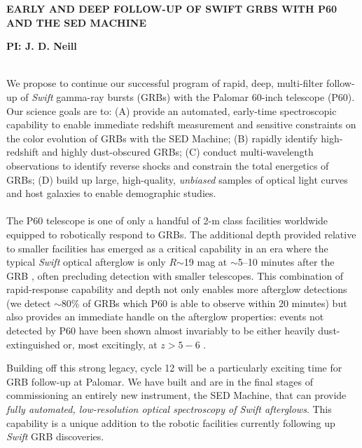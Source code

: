 \documentclass[letterpaper,11pt]{article}
\begin{document}
\pagestyle{plain}

\begin{center} 
\bfseries\uppercase{Early and Deep Follow-up of Swift GRBs with P60
and the SED Machine}
\end{center}
\vspace{-0.3cm}
\centerline{\bf PI: {J. D. Neill}}
 
\smallskip\\
We propose to continue our successful program of rapid, deep, multi-filter
follow-up of \textit{Swift} gamma-ray bursts (GRBs) with the Palomar 
60-inch telescope (P60).  Our science goals are to: (A) provide an automated, 
early-time spectroscopic capability to enable immediate redshift measurement 
and sensitive constraints on the color evolution of GRBs with the SED Machine;
(B) rapidly identify high-redshift and highly dust-obscured GRBs; (C) conduct 
multi-wavelength observations to identify reverse shocks and constrain the 
total energetics of GRBs; (D) build up large, high-quality, \textit{unbiased} 
samples of optical light curves and host galaxies to enable demographic 
studies. \\

\smallskip\\
The P60 telescope is one of only a handful of 2-m class facilities worldwide
equipped to robotically respond to GRBs.  The additional depth provided 
relative to smaller facilities has emerged as a critical capability in an 
era where the typical \textit{Swift} optical afterglow is only $R$$\sim$19 mag at 
$\sim$5--10 minutes after the GRB \citep{ckh+09,as+07}, often precluding 
detection with smaller telescopes.  This combination of rapid-response 
capability and depth not only enables more afterglow detections (we 
detect $\sim$80\% of GRBs which P60 is able to observe within 20 minutes) 
but also provides an immediate handle on the afterglow properties: events 
not detected by P60 have been shown almost invariably to be either heavily 
dust-extinguished or, most excitingly, at $z>5-6$ \citep{ckh+09,pcb+09}.

Building off this strong legacy, cycle 12 will be a particularly exciting
time for GRB follow-up at Palomar.  We have built and are in the final
stages of commissioning an entirely new instrument, the SED Machine,
that can provide \textit{fully automated, low-resolution optical spectroscopy
of Swift afterglows}.  This capability is a unique addition to the robotic
facilities currently following up \textit{Swift} GRB discoveries.
\end{document}
